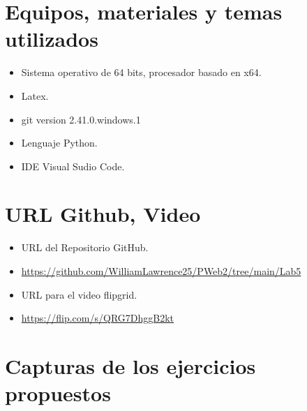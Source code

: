 \documentclass{article}
\begin{document}
	\section{Equipos, materiales y temas utilizados}
	\begin{itemize}
		\item Sistema operativo de 64 bits, procesador basado en x64.
		\item Latex. 
		\item git version 2.41.0.windows.1
		\item Lenguaje Python.
		\item IDE Visual Sudio Code.
	\end{itemize}
	\section{URL Github, Video}
	\begin{itemize}
		\item URL del Repositorio GitHub.
		\item \url{https://github.com/WilliamLawrence25/PWeb2/tree/main/Lab5}
		\item URL para el video flipgrid.
		\item \url{https://flip.com/s/QRG7DhggB2kt}	
	
	\end{itemize}
	\clearpage	
	
	\section{Capturas de los ejercicios propuestos}
	
\end{document}
